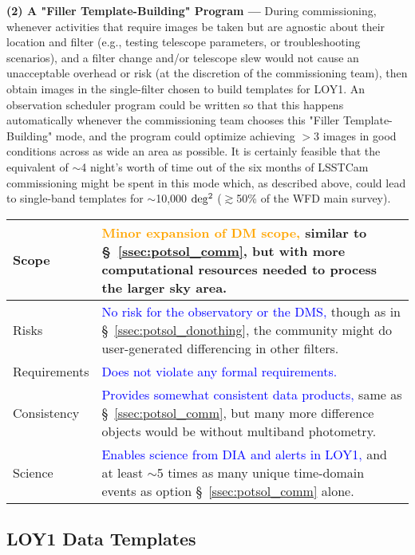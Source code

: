 \documentclass[DM,lsstdraft,toc]{lsstdoc}
\begin{document}
{\bf (2) A "Filler Template-Building" Program ---} During commissioning, whenever activities that require images be taken but are agnostic about their location and filter (e.g., testing telescope parameters, or troubleshooting scenarios), and a filter change and/or telescope slew would not cause an unacceptable overhead or risk (at the discretion of the commissioning team), then obtain images in the single-filter chosen to build templates for LOY1. An observation scheduler program could be written so that this happens automatically whenever the commissioning team chooses this "Filler Template-Building" mode, and the program could optimize achieving $>$3 images in good conditions across as wide an area as possible. It is certainly feasible that the equivalent of $\sim$4 night's worth of time out of the six months of LSSTCam commissioning might be spent in this mode which, as described above, could lead to single-band templates for $\sim$10,000 $\rm deg^2$ ($\gtrsim$50\% of the WFD main survey).

\begin{center}
\begin{tabular}{|p{2.5cm}|p{13cm}|}
\hline
Scope & \textcolor{orange}{Minor expansion of DM scope,} similar to \S~\ref{ssec:potsol_comm}, but with more computational resources needed to process the larger sky area.  \\
\hline
Risks & \textcolor{blue}{No risk for the observatory or the DMS,} though as in \S~\ref{ssec:potsol_donothing}, the community might do user-generated differencing in other filters. \\
\hline
Requirements & \textcolor{blue}{Does not violate any formal requirements.} \\
\hline
Consistency & \textcolor{blue}{Provides somewhat consistent data products,} same as \S~\ref{ssec:potsol_comm}, but many more difference objects would be without multiband photometry.  \\
\hline
Science & \textcolor{blue}{Enables science from DIA and alerts in LOY1,} and at least $\sim$5 times as many unique time-domain events as option \S~\ref{ssec:potsol_comm} alone. \\
\hline
\end{tabular}
\end{center}



\clearpage
\subsection{LOY1 Data Templates}\label{ssec:potsol_cont}
\end{document}
